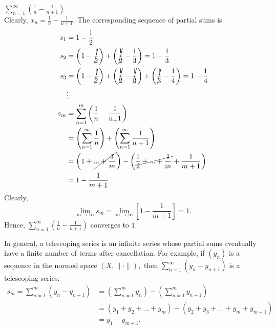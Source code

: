 \begin{example} \leavevmode
    $\sum_{n=1}^{\infty} \left(\frac{1}{n} - \frac{1}{n+1}\right)$ \\
    Clearly, $x_n = \frac{1}{n} - \frac{1}{n+1}.$ The corresponding sequence of partial sums is
    \begin{align*}
        s_1 &= 1 - \frac{1}{2} \\
        s_2 &= \left(1 - \cancel{\frac{1}{2}}\right) + \left(\cancel{\frac{1}{2}} - \frac{1}{3}\right) = 1 - \frac{1}{3} \\
        s_3 &= \left(1 - \cancel{\frac{1}{2}}\right) + \left(\cancel{\frac{1}{2}} - \cancel{\frac{1}{3}}\right) + \left(\cancel{\frac{1}{3}} - \frac{1}{4}\right) = 1 - \frac{1}{4} \\
        &\vdots \\
        s_m &= \sum_{n=1}^{m} \left(\frac{1}{n} - \frac{1}{n_+1}\right) \\ &= \left(\sum_{n=1}^{\infty} \frac{1}{n} \right) + \left(\sum_{n=1}^{\infty} \frac{1}{n+1}\right) \\
        &=\left(1 + \cancel{... + \frac{1}{m}}\right) - \left(\cancel{\frac{1}{2} + ... + \frac{1}{m}} + \frac{1}{m+1}\right) \\
        &= 1 - \frac{1}{m+1}
    \end{align*}
    Clearly,
    $$\lim_{m \to \infty}s_m = \lim_{m \to \infty}\left[1 - \frac{1}{m+1}\right] = 1.$$
    Hence, $\sum_{n=1}^{\infty} \left(\frac{1}{n} - \frac{1}{n+1}\right)$ converges to $1$.
\end{example}

In general, a telescoping series is an infinite series whose partial sums eventually have a finite number of terms after cancellation. For example, if $(y_n)$ is a sequence in the normed space $\left(X, \| \cdot \|\right),$ then $\sum_{n=1}^{\infty} \left(y_n - y_{n + 1}\right)$ is a telescoping series:
\begin{align*}
    s_m = \sum_{n=1}^{m}\left(y_n - y_{n+1}\right) &= \left(\sum_{n=1}^{m} y_n\right) - \left(\sum_{n=1}^{m}y_{n+1}\right) \\
    &= \left(y_1 + y_2 + ... + y_m\right) - \left(y_2 + y_3 + ... + y_m + y_{m+1}\right) \\ 
    &= y_1 - y_{m+1}.
\end{align*}

